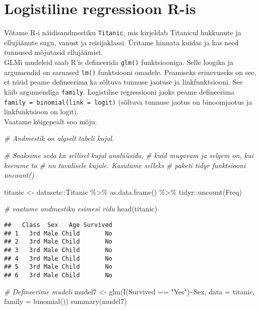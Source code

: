 \documentclass[
]{book}
\newenvironment{Shaded}{\begin{snugshade}}{\end{snugshade}}
\newcommand{\AttributeTok}[1]{\textcolor[rgb]{0.77,0.63,0.00}{#1}}
\newcommand{\CommentTok}[1]{\textcolor[rgb]{0.56,0.35,0.01}{\textit{#1}}}
\newcommand{\FunctionTok}[1]{\textcolor[rgb]{0.00,0.00,0.00}{#1}}
\newcommand{\NormalTok}[1]{#1}
\newcommand{\OtherTok}[1]{\textcolor[rgb]{0.56,0.35,0.01}{#1}}
\newcommand{\SpecialCharTok}[1]{\textcolor[rgb]{0.00,0.00,0.00}{#1}}
\newcommand{\StringTok}[1]{\textcolor[rgb]{0.31,0.60,0.02}{#1}}
\begin{document}
\hypertarget{logistiline-regressioon-r-is}{%
\section{Logistiline regressioon R-is}\label{logistiline-regressioon-r-is}}

Võtame R-i näidisandmestiku \texttt{Titanic}, mis kirjeldab Titanicul hukkunute ja ellujäänute sugu, vanust ja reisijaklassi. Üritame hinnata kuidas ja kas need tunnused mõjutasid ellujäämist.\\
GLMi mudeleid saab R'is defineerida \texttt{glm()} funktsiooniga. Selle loogika ja argumendid on sarnased \texttt{lm()} funktsiooni omadele. Peamiseks erinevuseks on see, et nüüd peame defineerima ka sõltuva tunnuse jaotuse ja linkfunktsiooni. See käib argumendiga \texttt{family}. Logistilise regressiooni jaoks peame defineerima \texttt{family\ =\ binomial(link\ =\ logit)} (sõltuva tunnuse jaotus on binoomjaotus ja linkfunktsioon on logit).\\
Vaatame kõigepealt soo mõju:

\begin{Shaded}
\begin{Highlighting}[]
\CommentTok{\# Andmestik on algselt tabeli kujul.}

\CommentTok{\# Saaksime seda ka sellisel kujul analüüsida,}
\CommentTok{\# kuid mugavam ja selgem on, kui keerame ta}
\CommentTok{\# nn tavalisele kujule. Kasutame selleks }
\CommentTok{\# paketi tidyr funktsiooni uncount()}

\NormalTok{titanic }\OtherTok{\textless{}{-}}\NormalTok{ datasets}\SpecialCharTok{::}\NormalTok{Titanic }\SpecialCharTok{\%\textgreater{}\%} 
  \FunctionTok{as.data.frame}\NormalTok{() }\SpecialCharTok{\%\textgreater{}\%} 
\NormalTok{  tidyr}\SpecialCharTok{::}\FunctionTok{uncount}\NormalTok{(Freq)}

\CommentTok{\# vaatame andmestiku esimesi ridu}
\FunctionTok{head}\NormalTok{(titanic)}
\end{Highlighting}
\end{Shaded}

\begin{verbatim}
##   Class  Sex   Age Survived
## 1   3rd Male Child       No
## 2   3rd Male Child       No
## 3   3rd Male Child       No
## 4   3rd Male Child       No
## 5   3rd Male Child       No
## 6   3rd Male Child       No
\end{verbatim}

\begin{Shaded}
\begin{Highlighting}[]
\CommentTok{\# Defineerime mudeli}
\NormalTok{mudel7 }\OtherTok{\textless{}{-}} \FunctionTok{glm}\NormalTok{(}\FunctionTok{I}\NormalTok{(Survived }\SpecialCharTok{==} \StringTok{"Yes"}\NormalTok{)}\SpecialCharTok{\textasciitilde{}}\NormalTok{Sex, }\AttributeTok{data =}\NormalTok{ titanic, }\AttributeTok{family =} \FunctionTok{binomial}\NormalTok{())}
\FunctionTok{summary}\NormalTok{(mudel7)}
\end{Highlighting}
\end{Shaded}
\end{document}
